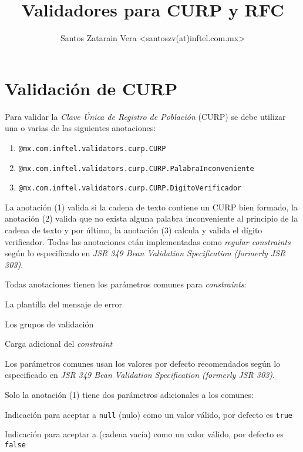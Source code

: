 \documentclass[12pt,letterpaper]{article}
\begin{document}
\title{Validadores para CURP y RFC}
\author{Santos Zatarain Vera <santoszv(at)inftel.com.mx>}

\maketitle

\tableofcontents

\section{Validación de CURP}

Para validar la \emph{Clave Única de Registro de Población} (CURP) se debe utilizar una o varias de
las siguientes anotaciones:

\begin{enumerate}[noitemsep]
\item \texttt{@mx.com.inftel.validators.curp.CURP}
\item \texttt{@mx.com.inftel.validators.curp.CURP.PalabraInconveniente}
\item \texttt{@mx.com.inftel.validators.curp.CURP.DigitoVerificador}
\end{enumerate}

La anotación (1) valida si la cadena de texto contiene un CURP bien formado, la anotación (2) valida que no exista
alguna palabra inconveniente al principio de la cadena de texto y por último, la anotación (3) calcula y valida
el dígito verificador. Todas las anotaciones etán implementadas como \emph{regular constraints} según lo especificado
en \emph{JSR 349 Bean Validation Specification (formerly JSR 303)}.

Todas anotaciones tienen los parámetros comunes para \emph{constraints}:

\begin{description}[noitemsep]
\item[message] La plantilla del mensaje de error
\item[groups] Los grupos de validación
\item[payload] Carga adicional del \emph{constraint}
\end{description}

Los parámetros comunes usan los valores por defecto recomendados según lo especificado en \emph{JSR 349 Bean
Validation Specification (formerly JSR 303)}.

Solo la anotación (1) tiene dos parámetros adicionales a los comunes:

\begin{description}[noitemsep]
\item[isNullValueValid] Indicación para aceptar a \texttt{null} (nulo) como un valor válido, por defecto
    es \texttt{true}
\item[isEmptyValueValid] Indicación para aceptar a \texttt{\textquotedbl\textquotedbl} (cadena vacía) como un valor
    válido, por defecto es \texttt{false}
\end{description}
\end{document}
